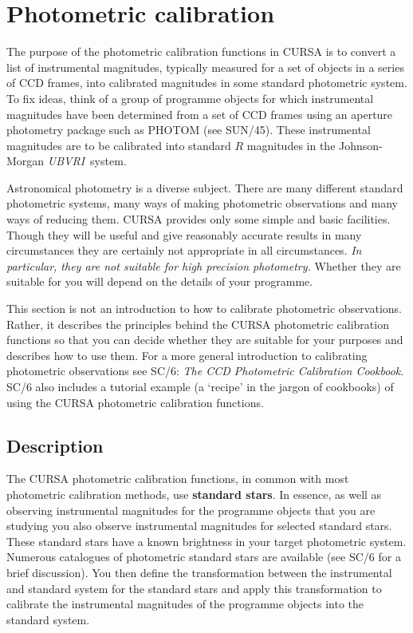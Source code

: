 \documentclass[twoside,11pt]{article}
\newcommand{\xref}[3]{#1}
\newcommand{\xlabel}[1]{}
\renewcommand{\_}{\texttt{\symbol{95}}}
\begin{document}
\section{\xlabel{PHOTCAL}\label{PHOTCAL}Photometric calibration}

The purpose of the photometric calibration functions in CURSA is to
convert a list of instrumental magnitudes, typically measured for a
set of objects in a series of CCD frames, into calibrated magnitudes
in some standard photometric system.  To fix ideas, think of a group
of programme objects for which instrumental magnitudes have been
determined from a set of CCD frames using an aperture photometry package
such as PHOTOM (see \xref{SUN/45}{sun45}{}\cite{SUN45}).  These
instrumental magnitudes are to be calibrated into standard $R$
magnitudes in the Johnson-Morgan {\it UBVRI}\, system.

Astronomical photometry is a diverse subject.  There are many different
standard photometric systems, many ways of making photometric
observations and many ways of reducing them.  CURSA provides only some
simple and basic facilities.  Though they will be useful and give
reasonably accurate results in many circumstances they are certainly
not appropriate in all circumstances.  {\it In particular, they are
not suitable for high precision photometry.}  Whether they are suitable
for you will depend on the details of your programme.

This section is not an introduction to how to calibrate photometric
observations.  Rather, it describes the principles behind the CURSA
photometric calibration functions so that you can decide whether they
are suitable for your purposes and describes how to use them.  For a
more general introduction to calibrating photometric observations
see \xref{SC/6: {\it The CCD Photometric Calibration
Cookbook}}{sc6}{}\cite{SC6}.  SC/6 also includes a tutorial example (a
`recipe' in the jargon of cookbooks) of using the CURSA photometric
calibration functions.


\subsection{Description}

The CURSA photometric calibration functions, in common with most photometric
calibration methods, use {\bf standard stars}.  In essence, as well as
observing instrumental magnitudes for the programme objects that you are
studying you also observe instrumental magnitudes for selected standard
stars.  These standard stars have a known brightness in your target
photometric system.  Numerous catalogues of photometric standard stars
are available (see \xref{SC/6}{sc6}{}\cite{SC6} for a brief discussion).
You then define the transformation between the instrumental and standard
system for the standard stars and apply this transformation to
calibrate the instrumental magnitudes of the programme objects into
the standard system.
\end{document}
